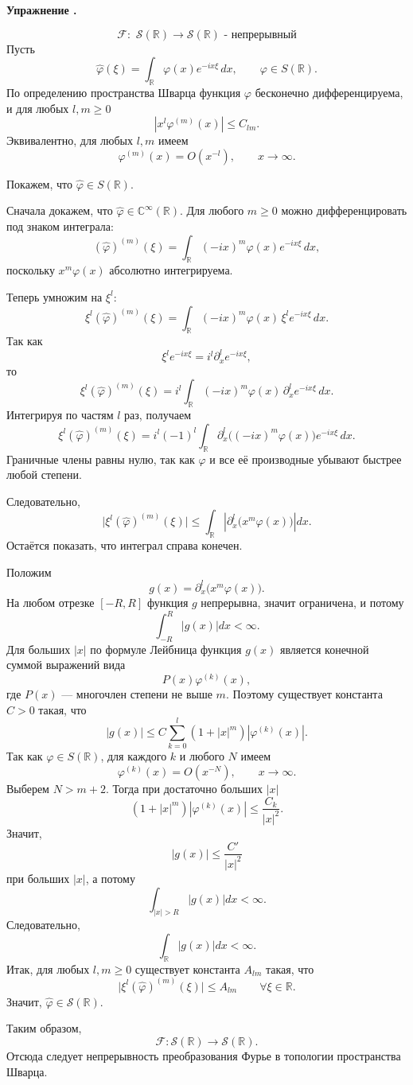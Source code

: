 \documentclass[11pt,a4paper]{report}
\numberwithin{equation}{section}
\numberwithin{figure}{chapter}
\numberwithin{table}{chapter}
\newif\ifinmathphysstatement
\newenvironment{myexe}[1][]{%
    \refstepcounter{exectr}%
    \inmathphysstatementtrue
    \begin{tcolorbox}[mathphysblock,colframe=exercisecolor,colback=exercisecolor!3,#1]
    \textbf{\color{exercisecolor}Упражнение \theexectr.}\par\smallskip
}{%
    \end{tcolorbox}
    \inmathphysstatementfalse
}
\newcommand{\R}{\mathbb{R}}
\newcommand{\C}{\mathbb{C}}
\newcommand{\F}{\mathcal{F}}
\newcommand{\SR}{\mathcal{S}(\R)}
\begin{document}
\begin{myexe}\label{sixth}
    $$\F: \,\, \SR\rightarrow\SR\text{ - непрерывный}$$
Пусть
\[
\widehat{\varphi}(\xi)=\int_{\R}\varphi(x)e^{-ix\xi}\,dx,
\qquad \varphi\in S(\R).
\]
По определению пространства Шварца функция $\varphi$ бесконечно дифференцируема, и для любых $l,m\ge 0$
\[
|x^l\varphi^{(m)}(x)|\le C_{lm}.
\]
Эквивалентно, для любых $l,m$ имеем
\[
\varphi^{(m)}(x)=O(x^{-l}), \qquad x\to\infty.
\]

Покажем, что $\widehat\varphi\in S(\R)$.

Сначала докажем, что $\widehat\varphi\in \C^\infty(\R)$. Для любого $m\ge 0$ можно дифференцировать под знаком интеграла:
\[
(\widehat\varphi)^{(m)}(\xi)=\int_{\R}(-ix)^m\varphi(x)e^{-ix\xi}\,dx,
\]
поскольку $x^m\varphi(x)$ абсолютно интегрируема.

Теперь умножим на $\xi^l$:
\[
\xi^l(\widehat\varphi)^{(m)}(\xi)
=\int_{\R}(-ix)^m\varphi(x)\,\xi^l e^{-ix\xi}\,dx.
\]
Так как
\[
\xi^l e^{-ix\xi}=i^l\partial_x^l e^{-ix\xi},
\]
то
\[
\xi^l(\widehat\varphi)^{(m)}(\xi)
=i^l\int_{\R}(-ix)^m\varphi(x)\,\partial_x^l e^{-ix\xi}\,dx.
\]
Интегрируя по частям $l$ раз, получаем
\[
\xi^l(\widehat\varphi)^{(m)}(\xi)
=i^l(-1)^l\int_{\R}\partial_x^l\bigl((-ix)^m\varphi(x)\bigr)e^{-ix\xi}\,dx.
\]
Граничные члены равны нулю, так как $\varphi$ и все её производные убывают
быстрее любой степени.

Следовательно,
\[
\bigl|\xi^l(\widehat\varphi)^{(m)}(\xi)\bigr|
\le
\int_{\R}\left|\partial_x^l\bigl(x^m\varphi(x)\bigr)\right|dx.
\]
Остаётся показать, что интеграл справа конечен.

Положим
\[
g(x)=\partial_x^l\bigl(x^m\varphi(x)\bigr).
\]
На любом отрезке $[-R,R]$ функция $g$ непрерывна, значит ограничена, и потому
\[
\int_{-R}^{R}|g(x)|dx<\infty.
\]
Для больших $|x|$ по формуле Лейбница функция $g(x)$ является конечной суммой выражений вида
\[
P(x)\varphi^{(k)}(x),
\]
где $P(x)$ --- многочлен степени не выше $m$. Поэтому существует константа $C>0$ такая, что
\[
|g(x)|\le C\sum_{k=0}^{l}(1+|x|^m)|\varphi^{(k)}(x)|.
\]
Так как $\varphi\in S(\R)$, для каждого $k$ и любого $N$ имеем
\[
\varphi^{(k)}(x)=O(x^{-N}), \qquad x\to\infty.
\]
Выберем $N>m+2$. Тогда при достаточно больших $|x|$
\[
(1+|x|^m)|\varphi^{(k)}(x)|
\le \frac{C_k}{|x|^2}.
\]
Значит,
\[
|g(x)|\le \frac{C'}{|x|^2}
\]
при больших $|x|$, а потому
\[
\int_{|x|>R}|g(x)|dx<\infty.
\]
Следовательно,
\[
\int_{\R}|g(x)|dx<\infty.
\]
Итак, для любых $l,m\ge 0$ существует константа $A_{lm}$ такая, что
\[
\bigl|\xi^l(\widehat\varphi)^{(m)}(\xi)\bigr|\le A_{lm}
\qquad \forall \xi\in\R.
\]
Значит, $\widehat\varphi\in \SR$.

Таким образом,
\[
\F:\SR\to \SR.
\]
Отсюда следует непрерывность преобразования Фурье в топологии
пространства Шварца.
\end{myexe}
\end{document}
